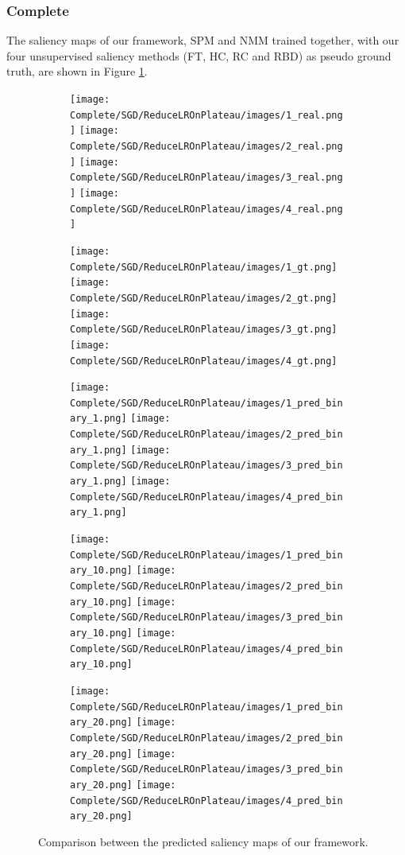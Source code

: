 \documentclass{article}
\begin{document}
\subsubsection{Complete}

The saliency maps of our framework, SPM and NMM trained together, with our four unsupervised saliency methods (FT, HC, RC and RBD) as pseudo ground truth, are shown in Figure \ref{fig:complete_sm}.

\begin{figure}[p]
  \centering
  \begin{subfigure}[c]{0.19\textwidth}
    \centering
      \texttt{[image: Complete/SGD/ReduceLROnPlateau/images/1\_real.png]}
      \texttt{[image: Complete/SGD/ReduceLROnPlateau/images/2\_real.png]}
      \texttt{[image: Complete/SGD/ReduceLROnPlateau/images/3\_real.png]}
      \texttt{[image: Complete/SGD/ReduceLROnPlateau/images/4\_real.png]}
  \end{subfigure}
  \begin{subfigure}[c]{0.19\textwidth}
    \centering
      \texttt{[image: Complete/SGD/ReduceLROnPlateau/images/1\_gt.png]}
      \texttt{[image: Complete/SGD/ReduceLROnPlateau/images/2\_gt.png]}
      \texttt{[image: Complete/SGD/ReduceLROnPlateau/images/3\_gt.png]}
      \texttt{[image: Complete/SGD/ReduceLROnPlateau/images/4\_gt.png]}
  \end{subfigure}
  \begin{subfigure}[c]{0.19\textwidth}
    \centering
    \texttt{[image: Complete/SGD/ReduceLROnPlateau/images/1\_pred\_binary\_1.png]}
    \texttt{[image: Complete/SGD/ReduceLROnPlateau/images/2\_pred\_binary\_1.png]}
    \texttt{[image: Complete/SGD/ReduceLROnPlateau/images/3\_pred\_binary\_1.png]}
    \texttt{[image: Complete/SGD/ReduceLROnPlateau/images/4\_pred\_binary\_1.png]}
  \end{subfigure}
  \begin{subfigure}[c]{0.19\textwidth}
    \centering
    \texttt{[image: Complete/SGD/ReduceLROnPlateau/images/1\_pred\_binary\_10.png]}
    \texttt{[image: Complete/SGD/ReduceLROnPlateau/images/2\_pred\_binary\_10.png]}
    \texttt{[image: Complete/SGD/ReduceLROnPlateau/images/3\_pred\_binary\_10.png]}
    \texttt{[image: Complete/SGD/ReduceLROnPlateau/images/4\_pred\_binary\_10.png]}
  \end{subfigure}
  \begin{subfigure}[c]{0.19\textwidth}
    \centering
    \texttt{[image: Complete/SGD/ReduceLROnPlateau/images/1\_pred\_binary\_20.png]}
    \texttt{[image: Complete/SGD/ReduceLROnPlateau/images/2\_pred\_binary\_20.png]}
    \texttt{[image: Complete/SGD/ReduceLROnPlateau/images/3\_pred\_binary\_20.png]}
    \texttt{[image: Complete/SGD/ReduceLROnPlateau/images/4\_pred\_binary\_20.png]}
  \end{subfigure}
  \caption{Comparison between the predicted saliency maps of our framework.}
  \label{fig:complete_sm}
\end{figure}
\end{document}
